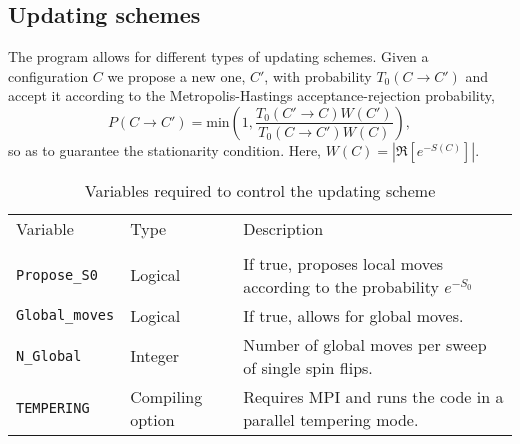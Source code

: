 
\subsection{Updating schemes}\label{sec:updating}
%
The program allows for different types of updating schemes.    Given a configuration $C$ we propose a new one, $C'$, with probability $T_0(C \rightarrow C')$  and accept it according to   the  Metropolis-Hastings   acceptance-rejection probability, 
\begin{equation}
	P(C \rightarrow C') =  \text{min}  \left( 1, \frac{T_0(C' \rightarrow C) W(C')}{T_0(C \rightarrow C') W(C)} \right),
\end{equation}
so as to guarantee the stationarity condition.  Here, $ W(C) = \left| \Re \left[ e^{-S(C)} \right] \right|   $.

\begin{table}[h]
   \begin{tabular}{@{} l l l @{}}\toprule
        Variable  &  Type                  &  Description   \\
         \\\midrule
       \texttt{Propose\_S0}   &    Logical       &  If true, proposes local moves according to the probability $e^{-S_0}$ \\
       \texttt{Global\_moves} & Logical       & If true, allows for global moves. \\
        \texttt{N\_Global }       & Integer        &   Number of global moves per sweep of single spin flips. \\
        \texttt{TEMPERING}   & Compiling option &    Requires MPI and  runs the code in a parallel tempering mode. 
         \\\bottomrule
   \end{tabular}
   \caption{   Variables  required to control the updating scheme    \label{table:Updating_schemes}}
\end{table}
% 
